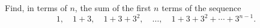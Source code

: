 Find, in terms of $n$, the sum of the first $n$ terms of the sequence
\[1,\quad1+3,\quad1+3+3^2,\quad\dots,\quad1+3+3^2+\cdots+3^{n-1}.\]
